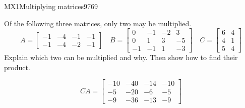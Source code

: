 \begin{exercise}{MX1}{Multiplying matrices}{9769} 
\begin{exerciseStatement} 

Of the following three matrices, only two may be multiplied. \[
          A=\left[\begin{array}{cccc}
-1 & -4 & -1 & -1 \\
-1 & -4 & -2 & -1
\end{array}\right] \hspace{1em} B=\left[\begin{array}{cccc}
0 & -1 & -2 & 3 \\
0 & 1 & 3 & -5 \\
-1 & -1 & 1 & -3
\end{array}\right] \hspace{1em} C=\left[\begin{array}{cc}
6 & 4 \\
4 & 1 \\
5 & 4
\end{array}\right]
      \] Explain which two can be multiplied and why. Then show how to find their product.

 \end{exerciseStatement}
 \begin{exerciseAnswer} \[CA=\left[\begin{array}{cccc}
-10 & -40 & -14 & -10 \\
-5 & -20 & -6 & -5 \\
-9 & -36 & -13 & -9
\end{array}\right]\] \end{exerciseAnswer}
 \end{exercise}


